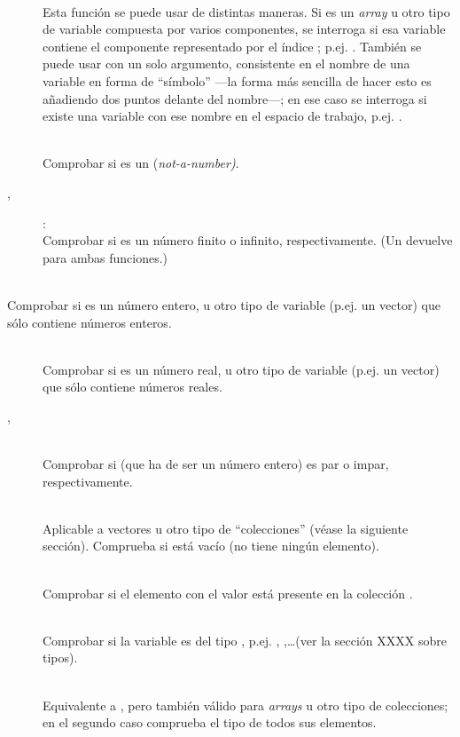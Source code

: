 ﻿\documentclass[spanish]{article}
\begin{document}
\begin{description}
  \item[] \hfill \\
  Esta función se puede usar de distintas maneras. Si  es un \emph{array} u otro tipo de variable compuesta por varios componentes, se interroga si esa variable contiene el componente representado por el índice ; p.ej. . También se puede usar con un solo argumento, consistente en el nombre de una variable en forma de ``símbolo'' ---la forma más sencilla de hacer esto es añadiendo dos puntos delante del nombre---; en ese caso se interroga si existe una variable con ese nombre en el espacio de trabajo, p.ej. .
  \item[] \hfill \\
  Comprobar si  es un  (\emph{not-a-number)}.
  \item[, ]: \hfill \\
  Comprobar si  es un número finito o infinito, respectivamente. (Un  devuelve  para ambas funciones.)
  \item[ \hfill \\
  Comprobar si  es un número entero, u otro tipo de variable (p.ej. un vector) que sólo contiene números enteros.
  \item[\code{isreal(x)}] \hfill \\
  Comprobar si  es un número real, u otro tipo de variable (p.ej. un vector) que sólo contiene números reales.
  \item[, ] \hfill \\
  Comprobar si  (que ha de ser un número entero) es par o impar, respectivamente.
  \item[] \hfill \\
  Aplicable a vectores u otro tipo de ``colecciones'' (véase la siguiente sección). Comprueba si  está vacío (no tiene ningún elemento).
  \item[] \hfill \\
  Comprobar si el elemento con el valor  está presente en la colección .
  \item[] \hfill \\
  Comprobar si la variable  es del tipo , p.ej. , ,\ldots (ver la sección XXXX sobre tipos).
  \item[] \hfill \\
  Equivalente a , pero también válido para \emph{arrays} u otro tipo de colecciones; en el segundo caso comprueba el tipo de todos sus elementos.
\end{description}
\end{document}
